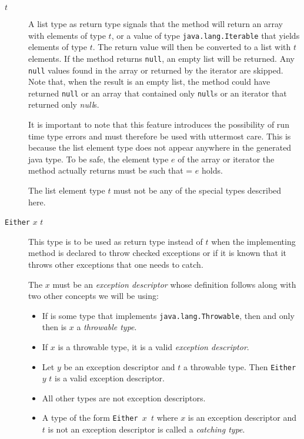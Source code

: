 \begin{description}
\item[\texttt{\bracka{}$t$\brackz{}}]
A list type as return type signals that the \java{} method will return an array with elements of type $t$, or a value of type \texttt{java.lang.Iterable} that yields elements of type $t$. The return value will then be converted to a \frege{} list with $t$ elements. If the method returns \texttt{null}, an empty list will be returned. Any \texttt{null} values found in the array or returned by the iterator are skipped. Note that, when the result is an empty list, the \java{} method could have returned \texttt{null} or an array that contained only \texttt{null}s or an iterator that returned only \textit{null}s.

It is important to note that this feature introduces the possibility of run time type errors
and must therefore be used with uttermost care.
This is because the list element type does not appear anywhere in the generated java type.
To be safe, the element type $e$ of the array or iterator the method actually returns must be such that  = $e$ holds.

The list element type $t$ must not be any of the special types described here.

\item[\texttt{Either} $x$ $t$] This type is to be used as return type instead of $t$ when the implementing method is declared to throw checked exceptions or if it is known that it throws other exceptions that one needs to catch.

The $x$ must be an \emph{exception descriptor} whose definition follows along with two other concepts we will be using:
\begin{itemize}
\item If  is some \java{} type that implements \texttt{java.lang.Throwable}, then and only then is $x$ a \emph{throwable type}. \label{throwable}
\item If $x$ is a throwable type, it is a valid \emph{exception descriptor}. \label{descriptor}
\item Let $y$ be an exception descriptor and $t$ a throwable type. 
Then \texttt{Either} $y$ $t$  is a valid exception descriptor.
\item All other types are not exception descriptors.
\item A type of the form \texttt{Either $x$ $t$} 
where $x$ is an exception descriptor and $t$ is not an exception descriptor is called a \emph{catching type}.
\label{catching}
\end{itemize}


\end{description}
